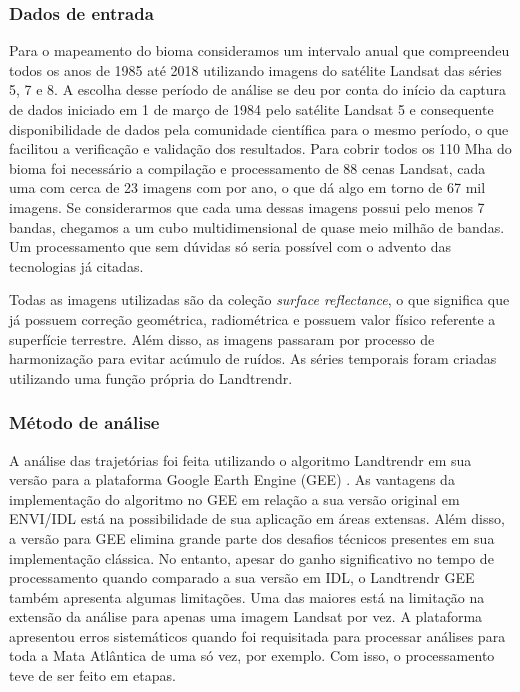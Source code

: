 \documentclass[12pt,a4paper]{article}
\begin{document}
\subsubsection{Dados de entrada}
\hspace{13pt} Para o mapeamento do bioma consideramos um intervalo anual que compreendeu todos os anos de 1985 até 2018 utilizando imagens do satélite Landsat das séries 5, 7 e 8. A escolha desse período de análise se deu por conta do início da captura de dados iniciado em 1 de março de 1984 pelo satélite Landsat 5 e consequente disponibilidade de dados pela comunidade científica para o mesmo período, o que facilitou a verificação e validação dos resultados. Para cobrir todos os 110 Mha do bioma foi necessário a compilação e processamento de 88 cenas Landsat, cada uma com cerca de 23 imagens com por ano, o que dá algo em torno de 67 mil imagens. Se considerarmos que cada uma dessas imagens possui pelo menos 7 bandas, chegamos a um cubo multidimensional de quase meio milhão de bandas. Um processamento que sem dúvidas só seria possível com o advento das tecnologias já citadas.

Todas as imagens utilizadas são da coleção \emph{surface reflectance}, o que significa que já possuem correção geométrica, radiométrica e possuem valor físico referente a superfície terrestre. Além disso, as imagens passaram por processo de harmonização para evitar acúmulo de ruídos. As séries temporais foram criadas utilizando uma função própria do Landtrendr.

\subsubsection{Método de análise}
\hspace{13pt} A análise das trajetórias foi feita utilizando o algoritmo Landtrendr em sua versão para a plataforma Google Earth Engine (GEE) \citep{Kennedy2018}. As vantagens da implementação do algoritmo no GEE em relação a sua versão original em ENVI/IDL está na possibilidade de sua aplicação em áreas extensas. Além disso, a versão para GEE elimina grande parte dos desafios técnicos presentes em sua implementação clássica. No entanto, apesar do ganho significativo no tempo de processamento quando comparado a sua versão em IDL, o Landtrendr GEE também apresenta algumas limitações. Uma das maiores está na limitação na extensão da análise para apenas uma imagem Landsat por vez. A plataforma apresentou erros sistemáticos quando foi requisitada para processar análises para toda a Mata Atlântica de uma só vez, por exemplo. Com isso, o processamento teve de ser feito em etapas. 
\end{document}

